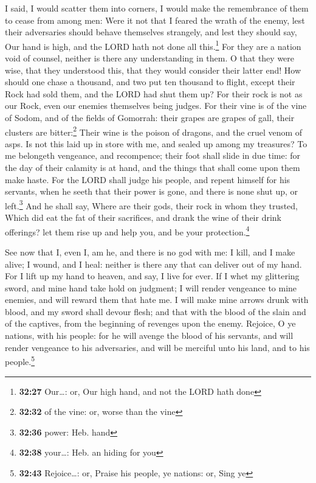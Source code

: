  I said, I would scatter them into corners, I would make
the remembrance of them to cease from among men:  Were it
not that I feared the wrath of the enemy, lest their adversaries should
behave themselves strangely, and lest they should say, Our hand is high,
and the LORD hath not done all this.\footnote{\textbf{32:27} Our\ldots:
  or, Our high hand, and not the LORD hath done}  For
they are a nation void of counsel, neither is there any understanding in
them.  O that they were wise, that they understood this,
that they would consider their latter end!  How should
one chase a thousand, and two put ten thousand to flight, except their
Rock had sold them, and the LORD had shut them up?  For
their rock is not as our Rock, even our enemies themselves being judges.
 For their vine is of the vine of Sodom, and of the
fields of Gomorrah: their grapes are grapes of gall, their clusters are
bitter:\footnote{\textbf{32:32} of the vine: or, worse than the vine}
 Their wine is the poison of dragons, and the cruel venom
of asps.  Is not this laid up in store with me, and
sealed up among my treasures?  To me belongeth vengeance,
and recompence; their foot shall slide in due time: for the day of their
calamity is at hand, and the things that shall come upon them make
haste.  For the LORD shall judge his people, and repent
himself for his servants, when he seeth that their power is gone, and
there is none shut up, or left.\footnote{\textbf{32:36} power: Heb. hand}
 And he shall say, Where are their gods, their rock in
whom they trusted,  Which did eat the fat of their
sacrifices, and drank the wine of their drink offerings? let them rise
up and help you, and be your protection.\footnote{\textbf{32:38}
  your\ldots: Heb. an hiding for you}

 See now that I, even I, am he, and there is no god with
me: I kill, and I make alive; I wound, and I heal: neither is there any
that can deliver out of my hand.  For I lift up my hand
to heaven, and say, I live for ever.  If I whet my
glittering sword, and mine hand take hold on judgment; I will render
vengeance to mine enemies, and will reward them that hate me.
 I will make mine arrows drunk with blood, and my sword
shall devour flesh; and that with the blood of the slain and of the
captives, from the beginning of revenges upon the enemy. 
Rejoice, O ye nations, with his people: for he will avenge the blood of
his servants, and will render vengeance to his adversaries, and will be
merciful unto his land, and to his people.\footnote{\textbf{32:43}
  Rejoice\ldots: or, Praise his people, ye nations: or, Sing ye}

